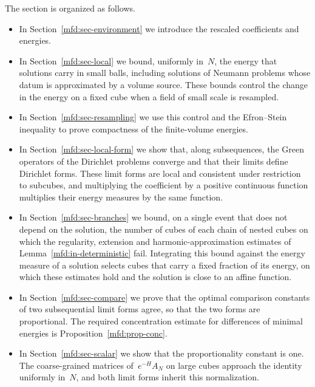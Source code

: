 \documentclass[11pt]{amsart}
\begin{document}
The section is organized as follows.
\begin{itemize}
\item In Section~\ref{mfd:sec-environment} we introduce the rescaled coefficients and energies.

\item In Section~\ref{mfd:sec-local} we bound, uniformly in~$N$, the energy that solutions carry in small balls, including solutions of Neumann problems whose datum is approximated by a volume source. These bounds control the change in the energy on a fixed cube when a field of small scale is resampled.

\item In Section~\ref{mfd:sec-resampling} we use this control and the Efron--Stein inequality to prove compactness of the finite-volume energies.

\item In Section~\ref{mfd:sec-local-form} we show that, along subsequences, the Green operators of the Dirichlet problems converge and that their limits define Dirichlet forms. These limit forms are local and consistent under restriction to subcubes, and multiplying the coefficient by a positive continuous function multiplies their energy measures by the same function.

\item In Section~\ref{mfd:sec-branches} we bound, on a single event that does not depend on the solution, the number of cubes of each chain of nested cubes on which the regularity, extension and harmonic-approximation estimates of Lemma~\ref{mfd:in-deterministic} fail. Integrating this bound against the energy measure of a solution selects cubes that carry a fixed fraction of its energy, on which these estimates hold and the solution is close to an affine function.

\item In Section~\ref{mfd:sec-compare} we prove that the optimal comparison constants of two subsequential limit forms agree, so that the two forms are proportional. The required concentration estimate for differences of minimal energies is Proposition~\ref{mfd:prop-conc}.

\item In Section~\ref{mfd:sec-scalar} we show that the proportionality constant is one. The coarse-grained matrices of~$e^{-H}A_N$ on large cubes approach the identity uniformly in~$N$, and both limit forms inherit this normalization.
\end{itemize}
\end{document}
